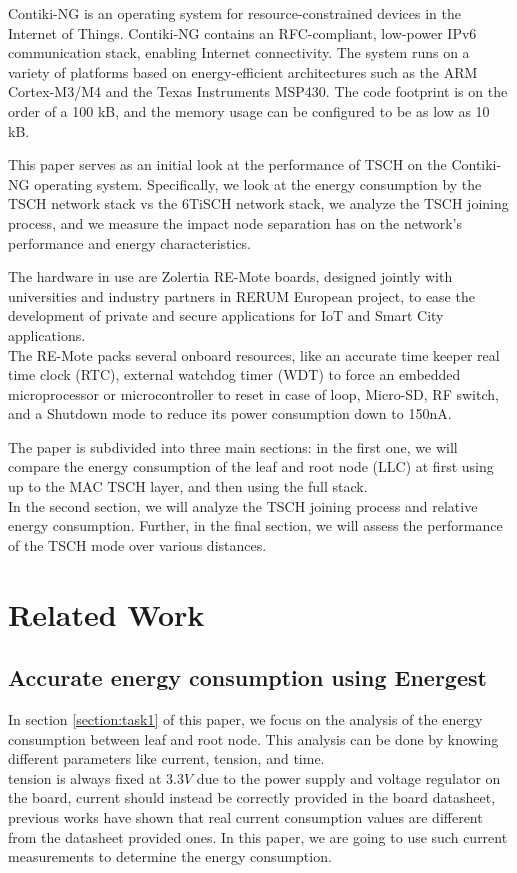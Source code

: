 \documentclass[conference]{IEEEtran}
\begin{document}
Contiki-NG is an operating system for resource-constrained devices in the Internet of Things. Contiki-NG contains an RFC-compliant, low-power IPv6 communication stack, enabling Internet connectivity. The system runs on a variety of platforms based on energy-efficient architectures such as the ARM Cortex-M3/M4 and the Texas Instruments MSP430. The code footprint is on the order of a 100 kB, and the memory usage can be configured to be as low as 10 kB. 

This paper serves as an initial look at the performance of TSCH on the Contiki-NG operating system. Specifically, we look at the energy consumption by the TSCH network stack vs the 6TiSCH network stack, we analyze the TSCH joining process, and we measure the impact node separation has on the network's performance and energy characteristics.

The hardware in use are Zolertia RE-Mote boards, designed jointly with universities and industry partners in RERUM European project, to ease the development of private and secure applications for IoT and Smart City applications.\\
The RE-Mote packs several onboard resources, like an accurate time keeper real time clock (RTC), external watchdog timer (WDT) to force an embedded microprocessor or microcontroller to reset in case of loop, Micro-SD, RF switch, and a Shutdown mode to reduce its power consumption down to 150nA\cite{contiki-NGWiki}.

The paper is subdivided into three main sections: in the first one, we will compare the energy consumption of the leaf and root node (LLC) at first using up to the MAC TSCH layer, and then using the full stack.\\
In the second section, we will analyze the TSCH joining process and relative energy consumption. Further, in the final section, we will assess the performance of the TSCH mode over various distances.

\section{Related Work}
\subsection{Accurate energy consumption using Energest}
In section \ref{section:task1} of this paper, we focus on the analysis of the energy consumption between leaf and root node. This analysis can be done by knowing different parameters like current, tension, and time.\\
tension is always fixed at $3.3V$ due to the power supply and voltage regulator on the board, current should instead be correctly provided in the board datasheet, previous works have shown that real current consumption values are different from the datasheet provided ones\cite{EnergyConsumption}. In this paper, we are going to use such current measurements to determine the energy consumption.
\end{document}
